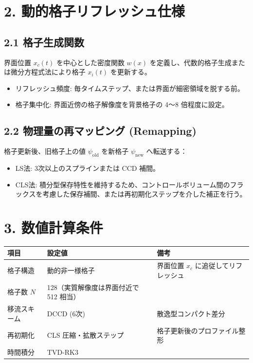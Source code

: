 \documentclass[12pt, a4paper, titlepage]{article}
\begin{document}
\section*{2. 動的格子リフレッシュ仕様}

\subsection*{2.1 格子生成関数}
界面位置 $x_c(t)$ を中心とした密度関数 $w(x)$ を定義し、代数的格子生成または微分方程式法により格子 $x_i(t)$ を更新する。
\begin{itemize}
    \item リフレッシュ頻度: 毎タイムステップ、または界面が細密領域を脱する前。
    \item 格子集中化: 界面近傍の格子解像度を背景格子の 4〜8 倍程度に設定。
\end{itemize}

\subsection*{2.2 物理量の再マッピング (Remapping)}
格子更新後、旧格子上の値 $\psi_{\text{old}}$ を新格子 $\psi_{\text{new}}$ へ転送する：
\begin{itemize}
    \item LS法: 3次以上のスプラインまたは CCD 補間。
    \item CLS法: 積分型保存特性を維持するため、コントロールボリューム間のフラックスを考慮した保存補間、または再初期化ステップを介した補正を行う。
\end{itemize}

\section*{3. 数値計算条件}

\noindent\begin{tabularx}{\linewidth}{|l|X|X|}
\hline
項目 & 設定値 & 備考 \\
\hline
格子構造 & 動的非一様格子 & 界面位置 $x_c$ に追従してリフレッシュ \\
格子数 $N$ & 128（実質解像度は界面付近で 512 相当） &  \\
移流スキーム & DCCD (6次) & 散逸型コンパクト差分 \\
再初期化 & CLS 圧縮・拡散ステップ & 格子更新後のプロファイル整形 \\
時間積分 & TVD-RK3 &  \\
\hline
\end{tabularx}
\end{document}
